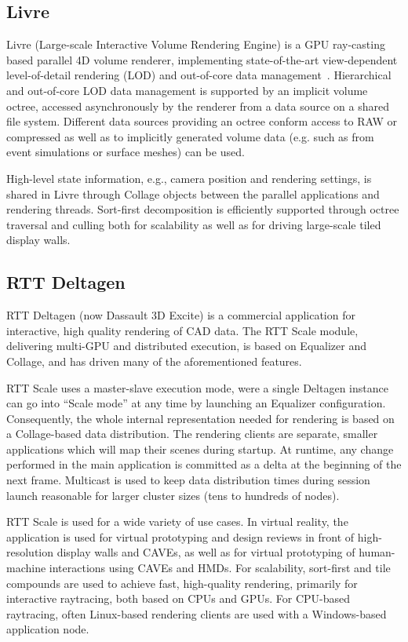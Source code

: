 \subsection{Livre}

Livre (Large-scale Interactive Volume Rendering Engine) is a GPU ray-casting
based parallel 4D volume renderer, implementing state-of-the-art view-dependent
level-of-detail rendering (LOD) and out-of-core data management~\cite{EHKRW:06}.
Hierarchical and out-of-core LOD data management is supported by an implicit
volume octree, accessed asynchronously by the renderer from a data source on a
shared file system. Different data sources providing an octree conform access to
RAW or compressed as well as to implicitly generated volume data (e.g. such as
from event simulations or surface meshes) can be used.

High-level state information, e.g., camera position and rendering settings, is
shared in Livre through \textsf{Collage} objects between the parallel
applications and rendering threads. Sort-first decomposition is efficiently
supported through octree traversal and culling both for scalability as well as
for driving large-scale tiled display walls.

\subsection{RTT Deltagen}

RTT Deltagen (now Dassault 3D Excite) is a commercial application for
interactive, high quality rendering of CAD data. The RTT Scale module,
delivering multi-GPU and distributed execution, is based on \textsf{Equalizer}
and \textsf{Collage}, and has driven many of the aforementioned features.

RTT Scale uses a master-slave execution mode, were a single Deltagen instance
can go into ``Scale mode'' at any time by launching an \textsf{Equalizer}
configuration. Consequently, the whole internal representation needed for
rendering is based on a \textsf{Collage}-based data distribution. The rendering
clients are separate, smaller applications which will map their scenes during
startup. At runtime, any change performed in the main application is committed
as a delta at the beginning of the next frame. Multicast is used to keep data
distribution times during session launch reasonable for larger cluster sizes
(tens to hundreds of nodes).

RTT Scale is used for a wide variety of use cases. In virtual reality, the
application is used for virtual prototyping and design reviews in front of
high-resolution display walls and CAVEs, as well as for virtual prototyping of
human-machine interactions using CAVEs and HMDs. For scalability, sort-first and
tile compounds are used to achieve fast, high-quality rendering, primarily for
interactive raytracing, both based on CPUs and GPUs. For CPU-based raytracing,
often Linux-based rendering clients are used with a Windows-based application
node.

